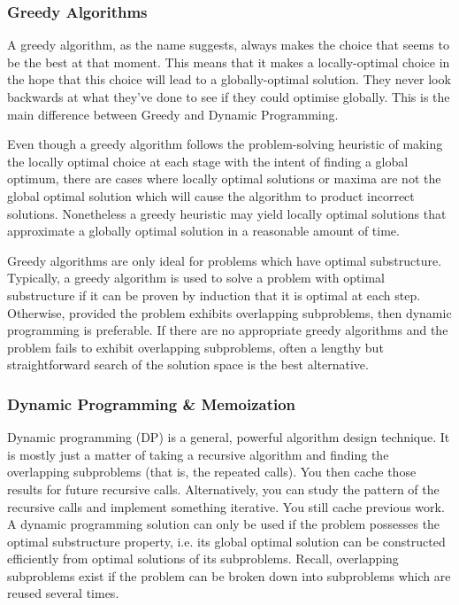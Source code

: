 \documentclass{article}
\begin{document}
    \subsubsection{Greedy Algorithms}
    A greedy algorithm, as the name suggests, always makes the choice that seems to be the best at that moment. This means that it makes a locally-optimal choice in the hope that this choice will lead to a globally-optimal solution. They never look backwards at what they’ve done to see if they could optimise globally. This is the main difference between Greedy and Dynamic Programming.

    Even though a greedy algorithm follows the problem-solving heuristic of making the locally optimal choice at each stage with the intent of finding a global optimum, there are cases where locally optimal solutions or maxima are not the global optimal solution which will cause the algorithm to product incorrect solutions. Nonetheless a greedy heuristic may yield locally optimal solutions that approximate a globally optimal solution in a reasonable amount of time.
    
    Greedy algorithms are only ideal for problems which have optimal substructure. Typically, a greedy algorithm is used to solve a problem with optimal substructure if it can be proven by induction that it is optimal at each step. Otherwise, provided the problem exhibits overlapping subproblems, then dynamic programming is preferable. If there are no appropriate greedy algorithms and the problem fails to exhibit overlapping subproblems, often a lengthy but straightforward search of the solution space is the best alternative.
    
    
    \subsubsection{Dynamic Programming \& Memoization}
    Dynamic programming (DP) is a general, powerful algorithm design technique. It is mostly just a matter of taking a recursive algorithm and finding the overlapping subproblems (that is, the repeated calls). You then cache those results for future recursive calls. Alternatively, you can study the pattern of the recursive calls and implement something iterative. You still cache previous work. A dynamic programming solution can only be used if the problem possesses the optimal substructure property, i.e. its global optimal solution can be constructed efficiently from optimal solutions of its subproblems. Recall, overlapping subproblems exist if the problem can be broken down into subproblems which are reused several times. 
    
\end{document}
